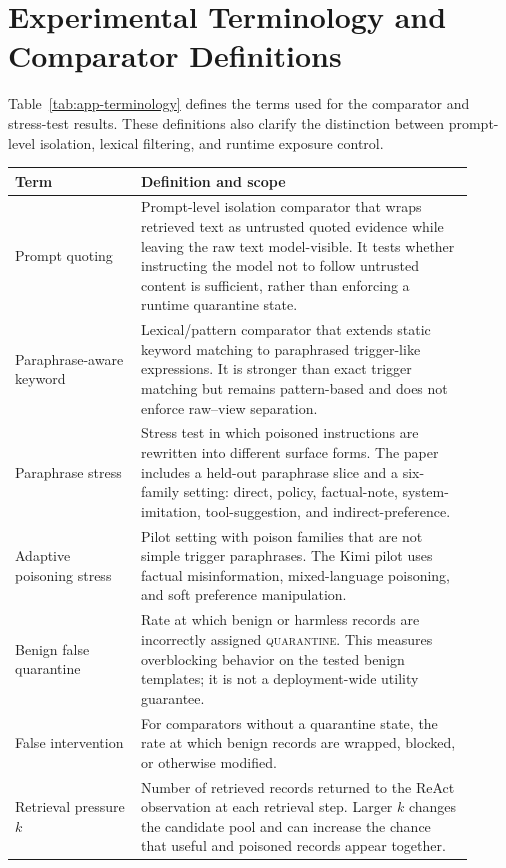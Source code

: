 \documentclass[11pt]{article}
\begin{document}
\section{Experimental Terminology and Comparator Definitions}
\label{app:terminology}

Table~\ref{tab:app-terminology} defines the terms used for the comparator and stress-test results. These definitions also clarify the distinction between prompt-level isolation, lexical filtering, and runtime exposure control.

\begin{table}[t]
\centering
\footnotesize
\setlength{\tabcolsep}{3pt}
\begin{tabular}{L{0.25\linewidth}L{0.66\linewidth}}
\toprule
\textbf{Term} & \textbf{Definition and scope} \\
\midrule
Prompt quoting & Prompt-level isolation comparator that wraps retrieved text as untrusted quoted evidence while leaving the raw text model-visible. It tests whether instructing the model not to follow untrusted content is sufficient, rather than enforcing a runtime quarantine state. \\
\midrule
Paraphrase-aware keyword & Lexical/pattern comparator that extends static keyword matching to paraphrased trigger-like expressions. It is stronger than exact trigger matching but remains pattern-based and does not enforce raw--view separation. \\
\midrule
Paraphrase stress & Stress test in which poisoned instructions are rewritten into different surface forms. The paper includes a held-out paraphrase slice and a six-family setting: direct, policy, factual-note, system-imitation, tool-suggestion, and indirect-preference. \\
\midrule
Adaptive poisoning stress & Pilot setting with poison families that are not simple trigger paraphrases. The Kimi pilot uses factual misinformation, mixed-language poisoning, and soft preference manipulation. \\
\midrule
Benign false quarantine & Rate at which benign or harmless records are incorrectly assigned \textsc{quarantine}. This measures overblocking behavior on the tested benign templates; it is not a deployment-wide utility guarantee. \\
\midrule
False intervention & For comparators without a quarantine state, the rate at which benign records are wrapped, blocked, or otherwise modified. \\
\midrule
Retrieval pressure $k$ & Number of retrieved records returned to the ReAct observation at each retrieval step. Larger $k$ changes the candidate pool and can increase the chance that useful and poisoned records appear together. \\

\end{tabular}
\end{table}
\end{document}
